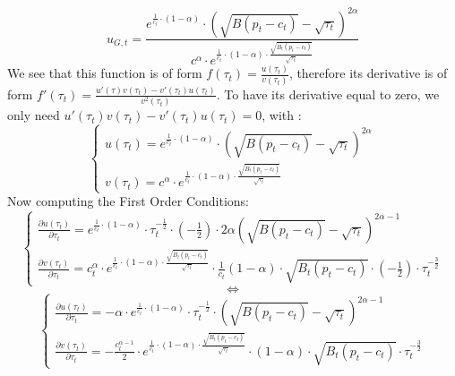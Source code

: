 \documentclass{article}
\begin{document}
$$u_{G,t}=\frac{e^{\frac{1}{c_{t}}\cdot\left(1-\alpha\right)}\cdot\left(\sqrt{B(p_{t}-c_{t})}-\sqrt{\tau_{t}}\right)^{2\alpha}}{c^{\alpha}\cdot e^{\frac{1}{c_{t}}\cdot(1-\alpha)\cdot\frac{\sqrt{B_{t}(p_{t}-c_{t})}}{\sqrt{\tau_{t}}}}}$$
We see that this function is of form $f(\tau_{t})=\frac{u(\tau_{t})}{v(\tau_{t})}$, therefore its derivative is of form $f'(\tau_{t})=\frac{u'(\tau)v(\tau_{t})-v'(\tau_{t})u(\tau_{t})}{v^2(\tau_{t})}$. To have its derivative equal to zero, we only need $u'(\tau_{t})v(\tau_{t})-v'(\tau_{t})u(\tau_{t})=0$, with :
\begin{equation*}
    \begin{cases}
        u(\tau_{t})= e^{\frac{1}{c_{t}}\cdot\left(1-\alpha\right)}\cdot\left(\sqrt{B(p_{t}-c_{t})}-\sqrt{\tau_{t}}\right)^{2\alpha}\\
        v(\tau_{t})= c^{\alpha}\cdot e^{\frac{1}{c_{t}}\cdot(1-\alpha)\cdot\frac{\sqrt{B_{t}(p_{t}-c_{t})}}{\sqrt{\tau_{t}}}}
    \end{cases}
\end{equation*}
Now computing the First Order Conditions:
\begin{equation*}
    \begin{cases}
        \frac{\partial u(\tau_{t})}{\partial \tau_{t}}= e^{\frac{1}{c_{t}}\cdot\left(1-\alpha\right)}\cdot \tau_{t}^{-\frac{1}{2}}\cdot \left(-\frac{1}{2}\right)\cdot 2\alpha \left(\sqrt{B(p_{t}-c_{t})}-\sqrt{\tau_{t}}\right)^{2\alpha-1} \\
        \frac{\partial v(\tau_{t})}{\partial \tau_{t}}= c_{t}^{\alpha}\cdot e^{\frac{1}{c_{t}}\cdot(1-\alpha)\cdot\frac{\sqrt{B_{t}(p_{t}-c_{t})}}{\sqrt{\tau_{t}}}}\cdot \frac{1}{c_{t}}(1-\alpha)\cdot\sqrt{B_{t}(p_{t}-c_{t})}\cdot\left(-\frac{1}{2}\right)\cdot\tau_{t}^{-\frac{3}{2}}
    \end{cases}
\end{equation*}
$$\iff$$
\begin{equation*}
    \begin{cases}
        \frac{\partial u(\tau_{t})}{\partial \tau_{t}}= -\alpha\cdot e^{\frac{1}{c_{t}}\cdot\left(1-\alpha\right)}\cdot \tau_{t}^{-\frac{1}{2}}\cdot \left(\sqrt{B(p_{t}-c_{t})}-\sqrt{\tau_{t}}\right)^{2\alpha-1} \\
        \frac{\partial v(\tau_{t})}{\partial \tau_{t}}= -\frac{c_{t}^{\alpha-1}}{2}\cdot e^{\frac{1}{c_{t}}\cdot(1-\alpha)\cdot\frac{\sqrt{B_{t}(p_{t}-c_{t})}}{\sqrt{\tau_{t}}}}\cdot (1-\alpha)\cdot\sqrt{B_{t}(p_{t}-c_{t})}\cdot\tau_{t}^{-\frac{3}{2}}
    \end{cases}
\end{equation*}
\end{document}
